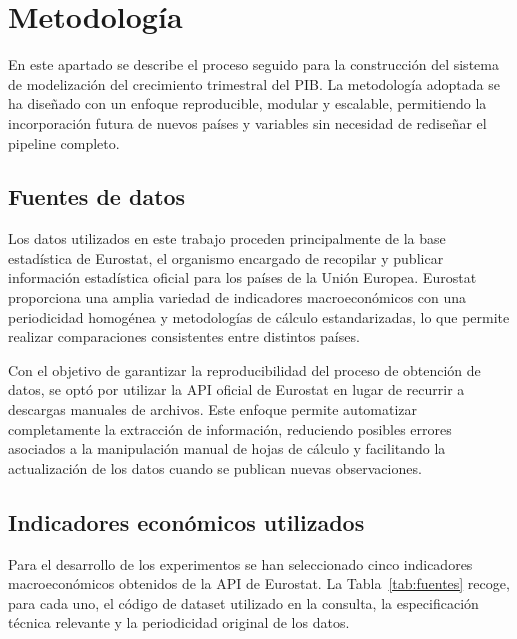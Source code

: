 
\chapter{Metodología}
\label{metodologia}

En este apartado se describe el proceso seguido para la construcción del sistema de modelización del crecimiento trimestral del PIB. La metodología adoptada se ha diseñado con un enfoque reproducible, modular y escalable, permitiendo la incorporación futura de nuevos países y variables sin necesidad de rediseñar el pipeline completo.

\section{Fuentes de datos}

Los datos utilizados en este trabajo proceden principalmente de la base estadística de Eurostat, el organismo encargado de recopilar y publicar información estadística oficial para los países de la Unión Europea. Eurostat proporciona una amplia variedad de indicadores macroeconómicos con una periodicidad homogénea y metodologías de cálculo estandarizadas, lo que permite realizar comparaciones consistentes entre distintos países.

Con el objetivo de garantizar la reproducibilidad del proceso de obtención de datos, se optó por utilizar la API oficial de Eurostat en lugar de recurrir a descargas manuales de archivos. Este enfoque permite automatizar completamente la extracción de información, reduciendo posibles errores asociados a la manipulación manual de hojas de cálculo y facilitando la actualización de los datos cuando se publican nuevas observaciones.

\section{Indicadores económicos utilizados}

Para el desarrollo de los experimentos se han seleccionado cinco indicadores macroeconómicos obtenidos de la API de Eurostat. La Tabla~\ref{tab:fuentes} recoge, para cada uno, el código de dataset utilizado en la consulta, la especificación técnica relevante y la periodicidad original de los datos.


